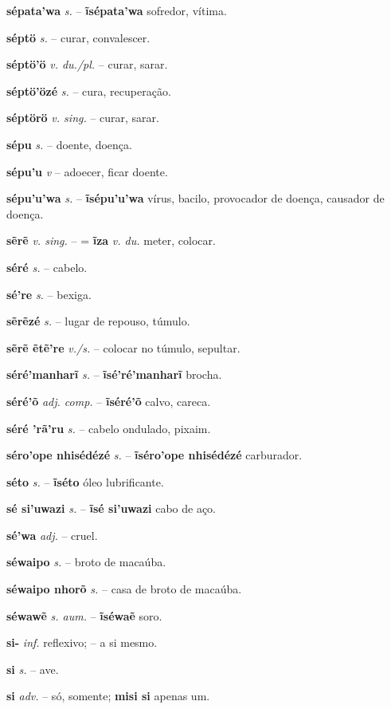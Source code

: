 \textbf{sépata'wa} \textit{s.} -- \textbf{ĩsépata'wa} sofredor, vítima.

\textbf{séptö} \textit{s.} -- curar, convalescer.

\textbf{séptö'ö} \textit{v. du./pl.} -- curar, sarar.

\textbf{séptö'özé} \textit{s.} -- cura, recuperação.

\textbf{séptörö} \textit{v. sing.} -- curar, sarar.

\textbf{sépu} \textit{s.} -- doente, doença.

\textbf{sépu'u} \textit{v} -- adoecer, ficar doente.

\textbf{sépu'u'wa} \textit{s.} -- \textbf{ĩsépu'u'wa} vírus, bacilo, provocador de doença, causador de doença.

\textbf{sẽrẽ} \textit{v. sing.} -- = \textbf{ĩza} \textit{v. du.} meter, colocar.

\textbf{séré} \textit{s.} -- cabelo.

\textbf{sé're} \textit{s.} -- bexiga.

\textbf{sẽrẽzé} \textit{s.} -- lugar de repouso, túmulo.

\textbf{sẽrẽ ẽtẽ're} \textit{v./s.} -- colocar no túmulo, sepultar.

\textbf{séré'manharĩ} \textit{s.} -- \textbf{ĩsé'ré'manharĩ} brocha.

\textbf{séré'õ} \textit{adj. comp.} -- \textbf{ĩséré'õ} calvo, careca.

\textbf{séré 'rã'ru} \textit{s.} -- cabelo ondulado, pixaim.

\textbf{séro'ope nhisédézé} \textit{s.} -- \textbf{ĩséro'ope nhisédézé} carburador.

\textbf{séto} \textit{s.} -- \textbf{ĩséto} óleo lubrificante.

\textbf{sé si'uwazi} \textit{s.} -- \textbf{ĩsé si'uwazi} cabo de aço.

\textbf{sé'wa} \textit{adj.} -- cruel.

\textbf{séwaipo} \textit{s.} -- broto de macaúba.

\textbf{séwaipo nhorõ} \textit{s.} -- casa de broto de macaúba.

\textbf{séwawẽ} \textit{s. aum.} -- \textbf{ĩséwaẽ} soro.

\textbf{si-} \textit{inf.} reflexivo; -- a si mesmo.

\textbf{si} \textit{s.} -- ave.

\textbf{si} \textit{adv.} -- só, somente; \textbf{misi si} apenas um.

